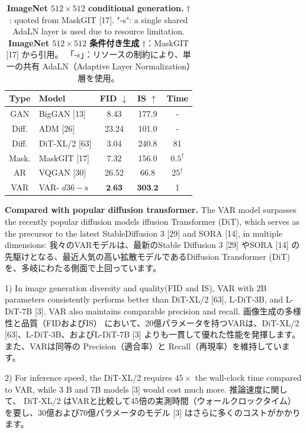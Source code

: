 \documentclass{article}
\begin{document}
\begin{table}[h]
\begin{center}
\caption{\textbf{ImageNet $512\times512$ conditional generation.} $\dagger$ : quoted from MaskGIT [17]. "-s": a single shared AdaLN layer is used due to resource limitation.
\textbf{ImageNet $512\times512$ 条件付き生成} $\dagger$：MaskGIT [17] から引用。 「-s」：リソースの制約により、単一の共有 AdaLN（Adaptive Layer Normalization）層を使用。
}
\begin{tabular}{c|l|ccc}
\hline
Type & Model & FID $\downarrow$ & IS $\uparrow$ & Time \\
\hline
GAN & BigGAN [13] & 8.43 & 177.9 & - \\
\hline
Diff. & ADM [26] & 23.24 & 101.0 & - \\
Diff. & DiT-XL/2 [63] & 3.04 & 240.8 & 81 \\
\hline
Mask. & MaskGIT [17] & 7.32 & 156.0 & $0.5^{\dagger}$ \\
\hline
AR & VQGAN [30] & 26.52 & 66.8 & $25^{\dagger}$ \\
VAR & VAR- $d 36-\mathrm{s}$ & $\mathbf{2 . 6 3}$ & $\mathbf{3 0 3 . 2}$ & 1 \\
\hline
\end{tabular}
\end{center}
\end{table}

\textbf{Compared with popular diffusion transformer.} The VAR model surpasses the recently popular diffusion models iffusion Transformer (DiT), which serves as the precursor to the latest StableDiffusion 3 [29] and SORA [14], in multiple dimensions: 
我々のVARモデルは、最新のStable Diffusion 3 [29] やSORA [14] の先駆けとなる、最近人気の高い拡散モデルであるDiffusion Transformer (DiT) を、多岐にわたる側面で上回っています。

1) In image generation diversity and quality(FID and IS), VAR with 2B parameters consistently performs better than DiT-XL/2 [63], L-DiT-3B, and L-DiT-7B [3]. VAR also maintains comparable precision and recall.
画像生成の多様性と品質（FIDおよびIS） において、20億パラメータを持つVARは、DiT-XL/2 [63]、L-DiT-3B、およびL-DiT-7B [3] よりも一貫して優れた性能を発揮します。また、VARは同等の Precision（適合率）と Recall（再現率）を維持しています。

2) For inference speed, the DiT-XL/2 requires $45 \times$ the wall-clock time compared to VAR, while 3 B and 7B models [3] would cost much more. 
推論速度に関して、 DiT-XL/2 はVARと比較して45倍の実測時間（ウォールクロックタイム）を要し、30億および70億パラメータのモデル [3] はさらに多くのコストがかかります。
\end{document}

